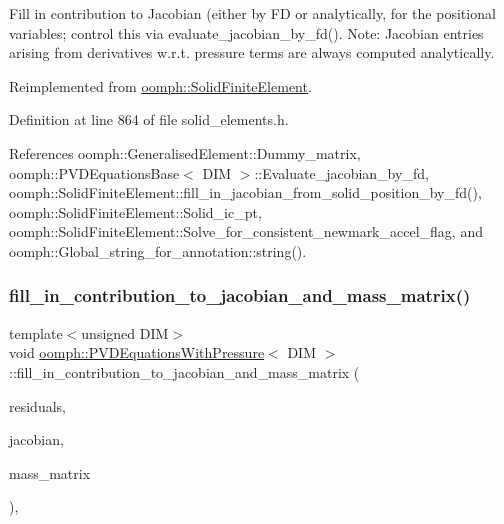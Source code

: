 Fill in contribution to Jacobian (either by FD or analytically, for the positional variables; control this via evaluate\+\_\+jacobian\+\_\+by\+\_\+fd(). Note\+: Jacobian entries arising from derivatives w.\+r.\+t. pressure terms are always computed analytically. 



Reimplemented from \hyperlink{classoomph_1_1SolidFiniteElement_a3167a2005e33815948bef357214e15ee}{oomph\+::\+Solid\+Finite\+Element}.



Definition at line 864 of file solid\+\_\+elements.\+h.



References oomph\+::\+Generalised\+Element\+::\+Dummy\+\_\+matrix, oomph\+::\+P\+V\+D\+Equations\+Base$<$ D\+I\+M $>$\+::\+Evaluate\+\_\+jacobian\+\_\+by\+\_\+fd, oomph\+::\+Solid\+Finite\+Element\+::fill\+\_\+in\+\_\+jacobian\+\_\+from\+\_\+solid\+\_\+position\+\_\+by\+\_\+fd(), oomph\+::\+Solid\+Finite\+Element\+::\+Solid\+\_\+ic\+\_\+pt, oomph\+::\+Solid\+Finite\+Element\+::\+Solve\+\_\+for\+\_\+consistent\+\_\+newmark\+\_\+accel\+\_\+flag, and oomph\+::\+Global\+\_\+string\+\_\+for\+\_\+annotation\+::string().

\mbox{\label{classoomph_1_1PVDEquationsWithPressure_ab505539c0e5f904d34e698544142ef7a}} 
\subsubsection{\texorpdfstring{fill\+\_\+in\+\_\+contribution\+\_\+to\+\_\+jacobian\+\_\+and\+\_\+mass\+\_\+matrix()}{fill\_in\_contribution\_to\_jacobian\_and\_mass\_matrix()}}
{\footnotesize\ttfamily template$<$unsigned D\+IM$>$ \\
void \hyperlink{classoomph_1_1PVDEquationsWithPressure}{oomph\+::\+P\+V\+D\+Equations\+With\+Pressure}$<$ D\+IM $>$\+::fill\+\_\+in\+\_\+contribution\+\_\+to\+\_\+jacobian\+\_\+and\+\_\+mass\+\_\+matrix (\begin{DoxyParamCaption}\item[{\hyperlink{classoomph_1_1Vector}{Vector}$<$ double $>$ \&}]{residuals,  }\item[{\hyperlink{classoomph_1_1DenseMatrix}{Dense\+Matrix}$<$ double $>$ \&}]{jacobian,  }\item[{\hyperlink{classoomph_1_1DenseMatrix}{Dense\+Matrix}$<$ double $>$ \&}]{mass\+\_\+matrix }\end{DoxyParamCaption})\hspace{0.3cm}{\ttfamily [inline]}, {\ttfamily [virtual]}}



